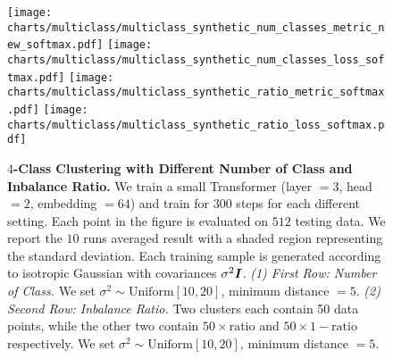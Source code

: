 \begin{figure}[!h]
        \texttt{[image: charts/multiclass/multiclass\_synthetic\_num\_classes\_metric\_new\_softmax.pdf]}
    \endminipage\hfill
        \texttt{[image: charts/multiclass/multiclass\_synthetic\_num\_classes\_loss\_softmax.pdf]}
    \endminipage\hfill
\endminipage\hfill
{}
        \texttt{[image: charts/multiclass/multiclass\_synthetic\_ratio\_metric\_softmax.pdf]}
    \endminipage\hfill
        \texttt{[image: charts/multiclass/multiclass\_synthetic\_ratio\_loss\_softmax.pdf]}
    \endminipage\hfill
\endminipage
\vspace{-1em}
\caption{\textbf{$4$-Class Clustering with Different Number of Class and Inbalance Ratio.}
We train a small Transformer (layer $=3$, head $=2$, embedding $= 64$) and train for $300$ steps for each different setting. Each point in the figure is evaluated on $512$ testing data.
We report the $10$ runs averaged result with a shaded region representing the standard deviation.
Each training sample is generated according to isotropic Gaussian with covariances $\sigma^2 \boldsymbol{I}$.
\emph{(1) First Row: Number of Class.} We set $\sigma^2 \sim \mathrm{Uniform}[10,20]$, minimum distance $=5$.
\emph{(2) Second Row: Inbalance Ratio.} Two clusters each contain 50 data points, while the other two contain $50 \times \mathrm{ratio}$ and $50 \times \mathrm{1-ratio}$ respectively. We set $\sigma^2 \sim \mathrm{Uniform}[10,20]$, minimum distance $=5$.}
\label{fig:inbalance}
\end{figure}


